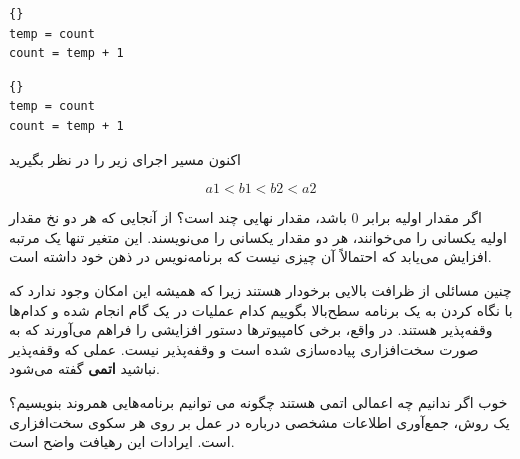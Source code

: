 \documentclass{book}
\begin{document}
\begin{latin}
\begin{minipage}[t]{2in}
\begin{latin}
\begin{lstlisting}[title=\rl{نخ \lr{A}}]{}
temp = count
count = temp + 1
\end{lstlisting}
\end{latin}
\end{minipage}
\hfill
\begin{minipage}[t]{2in}
\begin{latin}
\begin{lstlisting}[title=\rl{نخ \lr{B}}]{}
temp = count
count = temp + 1
\end{lstlisting}
\end{latin}
\end{minipage}
\end{latin}

    اکنون مسیر اجرای زیر را در نظر بگیرید
    
\[  a1 < b1 < b2 < a2  \]

    اگر مقدار اولیه  برابر \texttt{$0$} باشد، مقدار نهایی چند است؟
    از آنجایی که هر دو نخ مقدار اولیه یکسانی را می‌خوانند، هر دو مقدار یکسانی را می‌نویسند. 
    این متغیر تنها یک مرتبه افزایش می‌یابد که احتمالاً آن چیزی نیست که برنامه‌نویس در ذهن خود داشته است. 

    چنین مسائلی از ظرافت بالایی برخودار هستند 
    زیرا که     همیشه این امکان وجود ندارد که با نگاه کردن به یک برنامه سطح‌بالا 
    بگوییم کدام عملیات در یک گام انجام شده و کدام‌ها وقفه‌پذیر هستند. 
    در واقع،‌ برخی کامپیوترها دستور افزایشی را فراهم می‌آورند که به صورت سخت‌افزاری پیاده‌سازی شده است و وقفه‌پذیر نیست. 
    عملی که وقفه‌پذیر نباشید \textbf{اتمی} گفته می‌شود. 

    خوب اگر ندانیم چه اعمالی اتمی هستند چگونه می توانیم برنامه‌هایی همروند بنویسیم؟
    یک روش، جمع‌آوری اطلاعات مشخصی درباره در عمل بر روی هر سکوی سخت‌افزاری است. 
    ایرادات این رهیافت  واضح است. 
\end{document}
